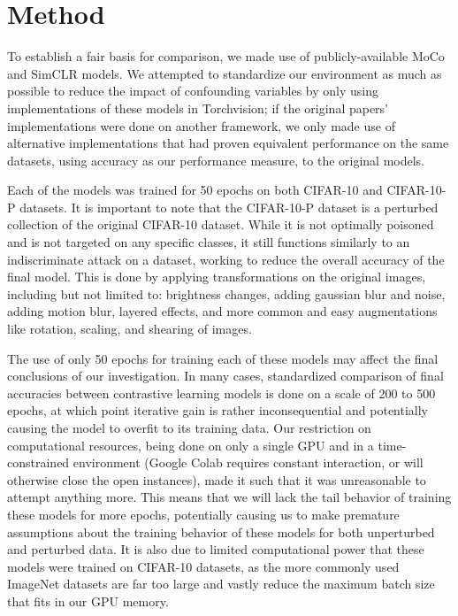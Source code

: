 \section{Method}
\begin{comment}
\begin{enumerate}
    \item Describe the research design, approach, and methodology.
    \item Detail the procedures and tools used for data collection and analysis.
    \item Ensure clarity and reproducibility for readers.
\end{enumerate}
\end{comment}
To establish a fair basis for comparison, we made use of publicly-available MoCo and SimCLR models. We attempted to standardize our environment as much as possible to reduce the impact of confounding variables by only using implementations of these models in Torchvision; if the original papers' implementations were done on another framework, we only made use of alternative implementations that had proven equivalent performance on the same datasets, using accuracy as our performance measure, to the original models.

Each of the models was trained for 50 epochs on both CIFAR-10 and CIFAR-10-P datasets. It is important to note that the CIFAR-10-P dataset is a perturbed collection of the original CIFAR-10 dataset. While it is not optimally poisoned and is not targeted on any specific classes, it still functions similarly to an indiscriminate attack on a dataset, working to reduce the overall accuracy of the final model. This is done by applying transformations on the original images, including but not limited to: brightness changes, adding gaussian blur and noise, adding motion blur, layered effects, and more common and easy augmentations like rotation, scaling, and shearing of images.

The use of only 50 epochs for training each of these models may affect the final conclusions of our investigation. In many cases, standardized comparison of final accuracies between contrastive learning models is done on a scale of 200 to 500 epochs, at which point iterative gain is rather inconsequential and potentially causing the model to overfit to its training data. Our restriction on computational resources, being done on only a single GPU and in a time-constrained environment (Google Colab requires constant interaction, or will otherwise close the open instances), made it such that it was unreasonable to attempt anything more. This means that we will lack the tail behavior of training these models for more epochs, potentially causing us to make premature assumptions about the training behavior of these models for both unperturbed and perturbed data. It is also due to limited computational power that these models were trained on CIFAR-10 datasets, as the more commonly used ImageNet datasets are far too large and vastly reduce the maximum batch size that fits in our GPU memory.


